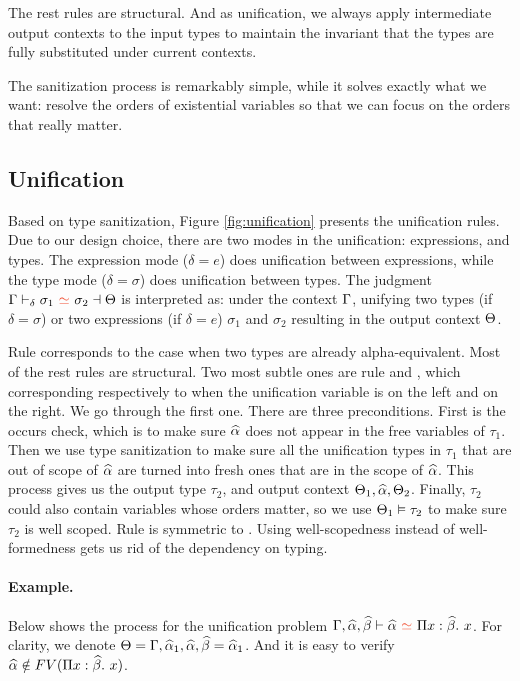 The rest rules are structural.
And as unification, we always apply intermediate output
contexts to the input types to maintain the invariant that the types are fully
substituted under current contexts.

The sanitization process is remarkably simple, while it solves exactly what we
want: resolve the orders of existential variables so that we can focus on the
orders that really matter.

\subsection{Unification}

Based on type sanitization, Figure \ref{fig:unification} presents the
unification rules. Due to our design choice, there are two modes in the
unification: expressions, and types. The expression mode ($\delta = e$) does
unification between expressions, while the type mode ($\delta = \sigma$) does
unification between types. The judgment $\tctx \bybuni \sigma_1 \uni \sigma_2
\toctx$ is interpreted as: under the context $\Gamma$, unifying two types (if
$\delta = \sigma$) or two expressions (if $\delta = e$) $\sigma_1$ and
$\sigma_2$ resulting in the output context $\Theta$.

Rule  corresponds to the case when two types are already
alpha-equivalent. Most of the rest rules are structural.
Two most subtle ones are rule  and , which
corresponding respectively to when the unification variable is on the left and on the
right. We go through the first one. There are three preconditions.
First is the occurs check, which is to make sure $\widehat{\alpha}$ does not appear in the
free variables of $\tau_1$.
Then we use type sanitization to make sure all the
unification types in $\tau_1$ that are out of scope of $\widehat{\alpha}$ are turned into
fresh ones that are in the scope of $\widehat{\alpha}$. This process gives us the output
type $\tau_2$, and output context $\Theta_1, \widehat{\alpha}, \Theta_2$.
Finally, $\tau_2$ could also contain
variables whose
orders matter, so
we use $\Theta_1 \vDash \tau_2$ to make sure $\tau_2$ is well scoped.
Rule  is symmetric to . Using well-scopedness
instead of well-formedness gets us rid of the dependency on typing.

\paragraph{Example.} Below shows the process for the unification problem
$\tctx, \genA, \genB \byuni \genA \uni \bpi x \genB x$.
For clarity, we denote $\Theta = \Gamma,\widehat{\alpha}_1,\widehat{\alpha},\widehat{\beta} =\widehat{\alpha}_1$. And it is
easy to verify  $\widehat{\alpha} \notin FV(\Pi x:\widehat{\beta}.~ x)$.

